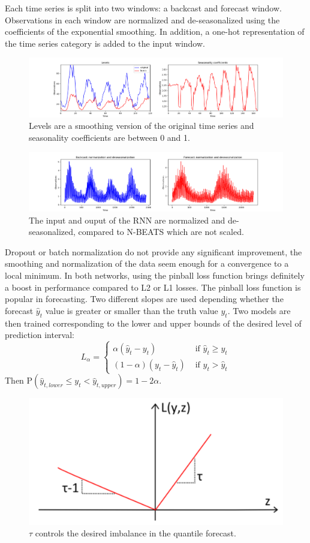 \documentclass{article}
\newcommand{\p}{\mathrm{P}}
\begin{document}
 Each time series is split into two windows: a backcast and forecast window.  Observations in each window are normalized and de-seasonalized using the coefficients of the exponential smoothing.
 In addition, a one-hot representation of the time series category is added to the input window.
 
 \begin{figure}[ht]
\centering
	\includegraphics[width=0.9\columnwidth]{H344_levels_seasonalities.png} 
\caption{Levels are a smoothing version of the original time series and \\ seasonality coefficients are between 0 and 1.}
\label{fig:levelsseasonality}
\end{figure}

\begin{figure}[ht]
\centering
	\includegraphics[width=0.9\columnwidth]{H344_windows.png} 
\caption{The input and ouput of the RNN are normalized and de-seasonalized, compared to N-BEATS which are not scaled.}
\label{fig:normalizeddeseasonalized}
\end{figure}
Dropout or batch normalization do not provide any significant improvement, the smoothing and normalization of the data seem enough for a convergence to a local minimum.
In both networks, using the pinball loss function brings definitely a boost in performance compared to L2 or L1 losses. The pinball loss function is popular in forecasting. 
Two different slopes are used depending whether the forecast $\hat{y}_t$ value is greater
or smaller than the truth value $y_t$. Two models are then trained corresponding to the lower and upper bounds of the desired level of prediction interval:
\[
	L_\alpha = 
	\begin{cases}
		\alpha (\hat{y}_t  - y_t) & \text{ if } \hat{y}_t \geq y_t \\
		(1-\alpha) (y_t - \hat{y}_t) & \text{ if }  y_t > \hat{y}_t
	\end{cases}
\]
Then $\p(\hat{y}_{t, lower} \le y_t < \hat{y}_{t, upper}) = 1 - 2 \alpha$.
\begin{figure}[ht]
\centering
	\includegraphics[width=0.4\columnwidth]{pinballloss.png} 
\caption{$\tau$ controls the desired imbalance in the quantile forecast.}
\label{fig:pinballloss}
\end{figure}
\end{document}
